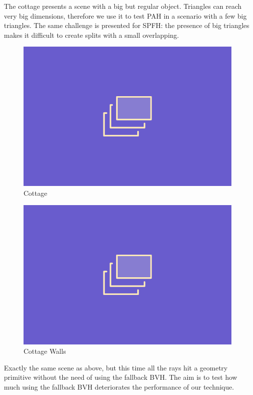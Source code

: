 \documentclass{PoliMi_MasterThesis}
\begin{document}
\begin{minipage}{0.55\textwidth}
	The cottage presents a scene with a big but regular object. Triangles can reach very big dimensions, therefore we use it to test PAH in a scenario with a few big triangles. The same challenge is presented for SPFH: the presence of big triangles makes it difficult to create splits with a small overlapping.
\end{minipage}
\hfill \begin{minipage}{0.4\textwidth}
	\begin{figure}[H]
		\includegraphics[width=\textwidth]{Images/TODO.png}
		\caption{Cottage}
		\label{fig:cottage}
	\end{figure}
\end{minipage} 

\begin{minipage}{0.4\textwidth}
	\begin{figure}[H]
		\includegraphics[width=\textwidth]{Images/TODO.png}
		\caption{Cottage Walls}
		\label{fig:cottage_walls}
	\end{figure}
\end{minipage} \hfill
\begin{minipage}{0.55\textwidth}
	Exactly the same scene as above, but this time all the rays hit a geometry primitive without the need of using the fallback BVH. The aim is to test how much using the fallback BVH deteriorates the performance of our technique.
\end{minipage}
\end{document}
